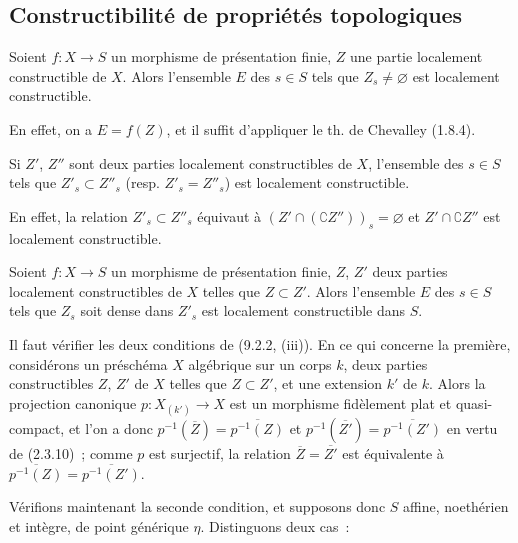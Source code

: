 \subsection{Constructibilité de propriétés topologiques}
\label{subsection:IV.9.5-fr}

\begin{proposition}[9.5.1]
\label{IV.9.5.1-fr}
Soient $f:X\to S$ un morphisme de présentation finie, $Z$ une partie
localement constructible de $X$. Alors l'ensemble $E$ des $s\in S$ tels que
$Z_s\neq\varnothing$ est localement constructible.
\end{proposition}

En effet, on a $E=f(Z)$, et il suffit d'appliquer le th. de Chevalley (1.8.4).

\begin{corollary}[9.5.2]
\label{IV.9.5.2-fr}
Si $Z'$, $Z''$ sont deux parties localement constructibles de $X$, l'ensemble
des $s\in S$ tels que $Z'_s\subset Z''_s$ \textnormal{(}resp.
$Z'_s=Z''_s$\textnormal{)} est localement constructible.
\end{corollary}

En effet, la relation $Z'_s\subset Z''_s$ équivaut à
$(Z'\cap(\complement Z''))_s=\varnothing$ et
$Z'\cap\complement Z''$ est localement constructible.

\begin{proposition}[9.5.3]
\label{IV.9.5.3-fr}
Soient $f:X\to S$ un morphisme de présentation finie, $Z$, $Z'$ deux parties
localement constructibles de $X$ telles que $Z\subset Z'$. Alors l'ensemble
$E$ des $s\in S$ tels que $Z_s$ soit dense dans $Z'_s$ est localement
constructible dans $S$.
\end{proposition}

Il faut vérifier les deux conditions de (9.2.2, (iii)). En ce qui concerne la
première, considérons un préschéma $X$ algébrique sur un corps $k$, deux parties
constructibles $Z$, $Z'$ de $X$ telles que $Z\subset Z'$, et une extension
$k'$ de $k$. Alors la projection canonique $p:X_{(k')}\to X$ est un morphisme
fidèlement plat et quasi-compact, et l'on a donc
$p^{-1}(\overline Z)=\overline{p^{-1}(Z)}$ et
$p^{-1}(\overline{Z'})=\overline{p^{-1}(Z')}$ en vertu de (2.3.10)~; comme
$p$ est surjectif, la relation $\overline Z=\overline{Z'}$ est équivalente à
$\overline{p^{-1}(Z)}=\overline{p^{-1}(Z')}$.

Vérifions maintenant la seconde condition, et supposons donc $S$ affine,
noethérien et intègre, de point générique $\eta$. Distinguons deux cas~:

